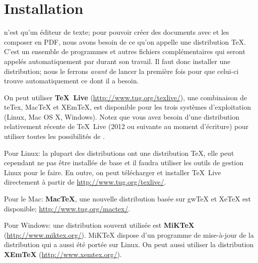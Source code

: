 
\chapter{Installation}
\label{chap.installation}

\Tw{} n'est qu'un éditeur de texte; pour pouvoir créer des documents avec \AllTeX{} et les composer en PDF, nous avons besoin de ce qu'on appelle une distribution \TeX{}. C'est un ensemble de programmes et autres fichiers complémentaires qui seront appelés automatiquement par \Tw{} durant son travail. Il faut donc installer une distribution; nous le ferrons \emph{avant} de lancer \Tw{} la première fois pour que celui-ci trouve automatiquement ce dont il a besoin.

On peut utiliser \textbf{TeX~Live} (\url{http://www.tug.org/texlive/}), une combinaison de teTex, MacTeX et XEmTeX, est disponible pour les trois systèmes d'exploitation (Linux, Mac OS X, Windows). Notez que vous avez besoin d'une distribution relativement récente de TeX~Live (2012 ou suivante au moment d'écriture) pour utiliser toutes les possibilités de {\Tw}.

\begin{OSLinux}
Pour Linux: la plupart des distributions ont une distribution \TeX, elle peut cependant ne pas être installée de base et il faudra utiliser les outils de gestion Linux pour le faire. En outre, on peut télécharger et installer TeX~Live directement à partir de \url{http://www.tug.org/texlive/}.
\end{OSLinux}
\vspace{6pt} 

\begin{OSMac}
Pour le Mac: \textbf{MacTeX}, une nouvelle distribution basée sur gwTeX et XeTeX est disponible; \url{http://www.tug.org/mactex/}.
\end{OSMac}
\vspace{6pt} 

\begin{OSWindows}
Pour Windows: une distribution souvent utilisée est \textbf{MiKTeX} (\url{http://www.miktex.org/}). MiKTeX dispose d'un programme de mise-à-jour de la distribution qui a aussi été portée sur Linux. On peut aussi utiliser la distribution \textbf{XEmTeX} (\url{http://www.xemtex.org/}).
\end{OSWindows}

